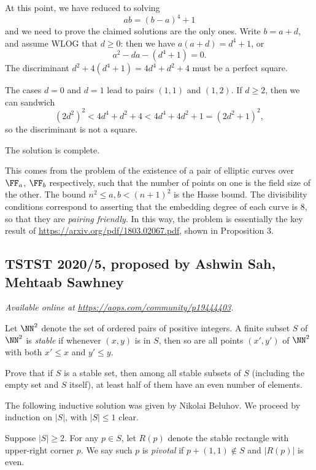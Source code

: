 \documentclass[11pt]{scrartcl}
\begin{document}
At this point, we have reduced to solving
\[ ab = (b-a)^4+1 \]
and we need to prove the claimed solutions are the only ones.
Write $b = a+d$, and assume WLOG that $d \ge 0$:
then we have $a(a+d) = d^4 + 1$, or
\[ a^2 - da - (d^4 + 1) = 0. \]
The discriminant $d^2 + 4(d^4 + 1)
= 4d^4 + d^2 + 4$ must be a perfect square.
\begin{itemize}
\ii The cases $d = 0$ and $d = 1$ lead to pairs $(1, 1)$ and $(1, 2)$.
\ii If $d \ge 2$, then we can sandwich
\[
  (2d^2)^2 < 4d^4 + d^2 + 4
  < 4d^4 + 4d^2 + 1 = (2d^2 + 1)^2,
\]
so the discriminant is not a square.
\end{itemize}
The solution is complete.

\begin{remark*}
  This comes from the problem of the existence of
  a pair of elliptic curves over $\FF_a$, $\FF_b$ respectively,
  such that the number of points on one is the field size of the other.
  The bound $n^2 \le a,b < (n+1)^2$ is the Hasse bound.
  The divisibility conditions correspond to asserting that the embedding degree of each curve is $8$,
  so that they are \emph{pairing friendly}.
  In this way, the problem is essentially the key result of \url{https://arxiv.org/pdf/1803.02067.pdf},
  shown in Proposition 3.
\end{remark*}
\pagebreak

\subsection{TSTST 2020/5, proposed by Ashwin Sah, Mehtaab Sawhney}
\textsl{Available online at \url{https://aops.com/community/p19444403}.}
\begin{mdframed}[style=mdpurplebox,frametitle={Problem statement}]
Let $\NN^2$ denote the set of ordered pairs of positive integers.
A finite subset $S$ of $\NN^2$ is \emph{stable}
if whenever $(x,y)$ is in $S$,
then so are all points $(x',y')$ of $\NN^2$
with both $x' \leq x$ and $y' \leq y$.

Prove that if $S$ is a stable set,
then among all stable subsets of $S$
(including the empty set and $S$ itself),
at least half of them have an even number of elements.
\end{mdframed}
The following inductive solution was given by Nikolai Beluhov.
We proceed by induction on $|S|$, with $|S| \le 1$ clear.

Suppose $|S| \ge 2$.
For any $p \in S$, let $R(p)$ denote
the stable rectangle with upper-right corner $p$.
We say such $p$ is \emph{pivotal} if $p + (1, 1) \notin S$
and $|R(p)|$ is even.
\end{document}
